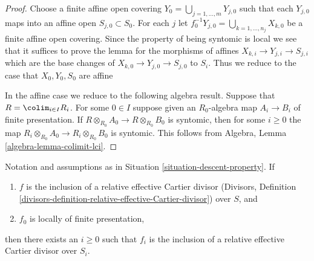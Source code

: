 \begin{proof}
Choose a finite affine open covering
$Y_0 = \bigcup_{j = 1, \ldots, m} Y_{j, 0}$
such that each $Y_{j, 0}$ maps into an affine open
$S_{j, 0} \subset S_0$. For each $j$ let
$f_0^{-1}Y_{j, 0} = \bigcup_{k = 1, \ldots, n_j} X_{k, 0}$ be a
finite affine open covering. Since the property of being syntomic is
local we see that it suffices to prove the lemma for the morphisms
of affines $X_{k, i} \to Y_{j, i} \to S_{j, i}$ which are the base
changes of $X_{k, 0} \to Y_{j, 0} \to S_{j, 0}$ to $S_i$.
Thus we reduce to the case that $X_0, Y_0, S_0$ are affine

\medskip\noindent
In the affine case we reduce to the following algebra result.
Suppose that $R = \colim_{i \in I} R_i$. For some $0 \in I$
suppose given an $R_0$-algebra map $A_i \to B_i$ of finite presentation.
If $R \otimes_{R_0} A_0 \to R \otimes_{R_0} B_0$ is syntomic, then
for some $i \geq 0$ the map
$R_i \otimes_{R_0} A_0 \to R_i \otimes_{R_0} B_0$ is syntomic.
This follows from Algebra,
Lemma \ref{algebra-lemma-colimit-lci}.
\end{proof}

\begin{lemma}
\label{lemma-descend-relative-effective-Cartier}
Notation and assumptions as in Situation \ref{situation-descent-property}.
If
\begin{enumerate}
\item $f$ is the inclusion of a relative effective Cartier divisor
(Divisors, Definition
\ref{divisors-definition-relative-effective-Cartier-divisor})
over $S$, and
\item $f_0$ is locally of finite presentation,
\end{enumerate}
then there exists an $i \geq 0$ such that $f_i$ is the inclusion of
a relative effective Cartier divisor over $S_i$.
\end{lemma}

